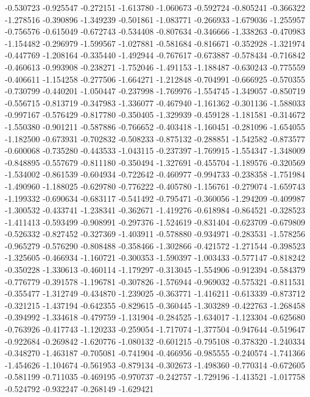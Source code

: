 -0.530723
-0.925547
-0.272151
-1.613780
-1.060673
-0.592724
-0.805241
-0.366322
-1.278516
-0.390896
-1.349239
-0.501861
-1.083771
-0.266933
-1.679036
-1.255957
-0.756576
-0.615049
-0.672743
-0.534408
-0.807634
-0.346666
-1.338263
-0.470983
-1.154482
-0.296979
-1.599567
-1.027881
-0.581684
-0.816671
-0.352928
-1.321974
-0.447769
-1.208164
-0.335440
-1.492944
-0.767617
-0.673887
-0.578434
-0.716842
-0.460613
-0.993908
-0.238271
-1.752046
-1.491153
-1.188487
-0.630243
-0.775559
-0.406611
-1.154258
-0.277506
-1.664271
-1.212848
-0.704991
-0.666925
-0.570355
-0.730799
-0.440201
-1.050447
-0.237998
-1.769976
-1.554745
-1.349057
-0.850719
-0.556715
-0.813719
-0.347983
-1.336077
-0.467940
-1.161362
-0.301136
-1.588033
-0.997167
-0.576429
-0.817780
-0.350405
-1.329939
-0.459128
-1.181581
-0.314672
-1.550380
-0.901211
-0.587886
-0.766652
-0.403418
-1.160451
-0.281096
-1.654055
-1.182500
-0.673931
-0.702832
-0.508233
-0.875132
-0.288851
-1.542582
-0.873577
-0.600068
-0.735280
-0.443533
-1.043115
-0.237397
-1.769915
-1.554347
-1.348009
-0.848895
-0.557679
-0.811180
-0.350494
-1.327691
-0.455704
-1.189576
-0.320569
-1.534002
-0.861539
-0.604934
-0.722642
-0.460977
-0.994733
-0.238358
-1.751984
-1.490960
-1.188025
-0.629780
-0.776222
-0.405780
-1.156761
-0.279074
-1.659743
-1.199332
-0.690634
-0.683117
-0.541492
-0.795471
-0.360056
-1.294209
-0.409987
-1.300532
-0.433741
-1.238341
-0.362671
-1.419276
-0.618984
-0.864521
-0.328523
-1.411413
-0.593499
-0.908991
-0.297376
-1.524619
-0.831404
-0.623709
-0.679809
-0.526332
-0.827452
-0.327369
-1.403911
-0.578880
-0.934971
-0.283531
-1.578256
-0.965279
-0.576290
-0.808488
-0.358466
-1.302866
-0.421572
-1.271544
-0.398523
-1.325605
-0.466934
-1.160721
-0.300353
-1.590397
-1.003433
-0.577147
-0.818242
-0.350228
-1.330613
-0.460114
-1.179297
-0.313045
-1.554906
-0.912394
-0.584379
-0.776779
-0.391578
-1.196781
-0.307826
-1.576944
-0.969032
-0.575321
-0.811531
-0.355477
-1.312749
-0.434870
-1.239025
-0.363771
-1.416211
-0.613339
-0.873712
-0.321215
-1.437194
-0.642355
-0.829615
-0.360445
-1.303289
-0.422763
-1.268458
-0.394992
-1.334618
-0.479759
-1.131904
-0.284525
-1.634017
-1.123304
-0.625680
-0.763926
-0.417743
-1.120233
-0.259054
-1.717074
-1.377504
-0.947644
-0.519647
-0.922684
-0.269842
-1.620776
-1.080132
-0.601215
-0.795108
-0.378320
-1.240334
-0.348270
-1.463187
-0.705081
-0.741904
-0.466956
-0.985555
-0.240574
-1.741366
-1.454626
-1.104674
-0.561953
-0.879134
-0.302673
-1.498360
-0.770314
-0.672605
-0.581199
-0.711035
-0.469195
-0.970737
-0.242757
-1.729196
-1.413521
-1.017758
-0.524792
-0.932247
-0.268149
-1.629421
